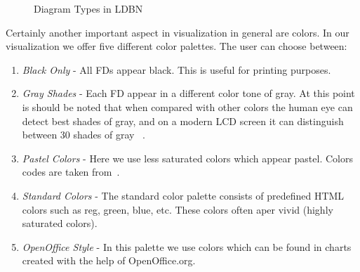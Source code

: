 \begin{figure}[h]
  \centering
\caption{Diagram Types in LDBN}
\end{figure}

Certainly another important aspect in visualization in general are colors.
In our visualization we offer five different color palettes. The user can 
choose between:
\begin{enumerate}
	\item \emph{Black Only} - All FDs appear black. This is useful for printing
	purposes.
	\item \emph{Gray Shades} - Each FD appear in a different color tone of gray. 
	At this point is should be noted that when compared with other colors 
	the human eye can detect best shades of gray, and on a modern LCD screen it can
	distinguish between 30 shades of gray~\cite[Chapter 2]{bimg1} . 
	\item \emph{Pastel Colors} - Here we use less saturated colors which appear pastel. 
	Colors codes are taken from~\cite{wpastel}.
	\item \emph{Standard Colors} - The standard color palette consists of predefined
	HTML colors such as reg, green, blue, etc. These colors often aper vivid 
	(highly saturated colors).
	\item \emph{OpenOffice Style} - In this  palette we use colors which
	can be found in charts created with the help of OpenOffice.org. 
\end{enumerate}
 
